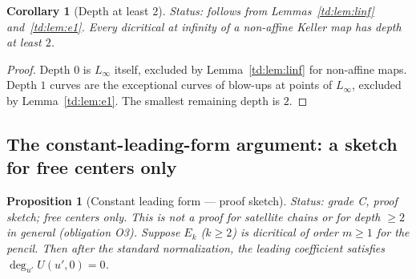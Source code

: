 \documentclass[a4paper,11pt]{article}
\theoremstyle{plain}
\newtheorem{proposition}[theorem]{Proposition}
\newtheorem{corollary}[theorem]{Corollary}
\theoremstyle{definition}
\theoremstyle{remark}
\begin{document}
\begin{corollary}[Depth at least $2$]\label{td:cor:depth2}
\textit{Status: follows from Lemmas~\ref{td:lem:linf} and~\ref{td:lem:e1}.}
Every dicritical at infinity of a non-affine Keller map has depth at least $2$.
\end{corollary}

\begin{proof}
Depth $0$ is $L_\infty$ itself, excluded by Lemma~\ref{td:lem:linf} for non-affine maps.
Depth $1$ curves are the exceptional curves of blow-ups at points of $L_\infty$, excluded by
Lemma~\ref{td:lem:e1}. The smallest remaining depth is $2$.
\end{proof}

\subsection{The constant-leading-form argument: a sketch for free centers only}\label{td:sec:constant-form}

\begin{proposition}[Constant leading form --- proof sketch]\label{td:prop:constant-form}
\textit{Status: grade C, proof sketch; free centers only. This is not a proof for satellite
chains or for depth $\geq 2$ in general (obligation O3).}
Suppose $E_k$ ($k \geq 2$) is dicritical of order $m \geq 1$ for the pencil. Then after the
standard normalization, the leading coefficient satisfies $\deg_{u'} U(u',0) = 0$.
\end{proposition}
\end{document}
